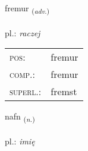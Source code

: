 \documentclass[frontgrid, backgrid]{flacards}\usepackage[]{graphicx}\usepackage[]{xcolor}
\begin{document}
\renewcommand{\flhead}{\vskip5pt \fboxsep=0pt {\small\bfseries\footnotesize Atviksorð | przysłówek}}
\renewcommand{\fcfoot}{\vskip5pt \fboxsep=0pt \hspace{2pt}{\small\bfseries\footnotesize 1K}}

\renewcommand{\blhead}{\vskip5pt {\small\bfseries\footnotesize Atviksorð | przysłówek }}
\renewcommand{\bcfoot}{\vskip5pt \hspace{2pt}{\small\bfseries\footnotesize 1K}}


{fremur \small{\textsubscript{(\textit{adv.})}} \\[1ex] %
\textphonetic{[frɛːmʏr]} \\
pl.: \emph{raczej} \\  [2ex]
\renewcommand*{\arraystretch}{0.8}
\begin{tabular}{ll}
\textsc{pos}: & fremur \\ 
\textsc{comp.}: & fremur \\ 
\textsc{superl.}: & fremst \\
\end{tabular}
}

\renewcommand{\flhead}{\vskip5pt \fboxsep=0pt {\small\bfseries\footnotesize Nafnorð | rzeczownik}}
\renewcommand{\fcfoot}{\vskip5pt \fboxsep=0pt \hspace{2pt}{\small\bfseries\footnotesize 1K}}

\renewcommand{\blhead}{\vskip5pt {\small\bfseries\footnotesize Nafnorð | rzeczownik }}
\renewcommand{\bcfoot}{\vskip5pt \hspace{2pt}{\small\bfseries\footnotesize 1K}}


{nafn \small{\textsubscript{(\textit{n.})}} \\[1ex] %
\textphonetic{[napn̥]} \\
pl.: \emph{imię} \\  [2ex]
\renewcommand*{\arraystretch}{0.8}
}
\end{document}
